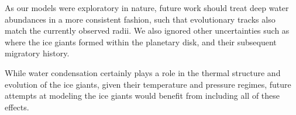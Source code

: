 \documentclass[11pt]{ucscthesisbs}
\begin{document}
As our models were exploratory in nature, future work should treat deep water abundances in a more consistent fashion, such that evolutionary tracks also match the currently observed radii. We also ignored other uncertainties such as where the ice giants formed within the planetary disk, and their subsequent migratory history.

While water condensation certainly plays a role in the thermal structure and evolution of the ice giants, given their temperature and pressure regimes, future attempts at modeling the ice giants would benefit from including all of these effects.
 

\newcommand{\newblock}{}

\end{document}
